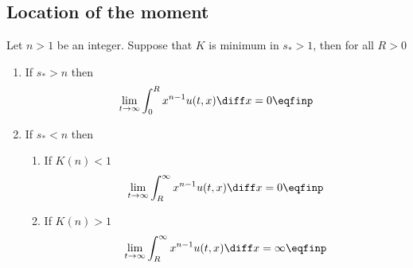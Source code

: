 \subsection{Location of the moment}

\begin{proposition} Let $n>1$ be an integer. Suppose that $K$ is minimum in $s_* > 1$, then for all $R > 0$
    \begin{enumerate}
        \item If $s_* > n$ then 
    \begin{align*}
        \lim_{t\to \infty} \int_0^R x^{n-1} u(t,x) \diff x = 0
        \eqfinp
    \end{align*}
        \item If $s_* < n$ then 
        \begin{enumerate}
            \item If $K(n) < 1$
            \begin{align*}
                \lim_{t\to \infty} \int_R^{\infty} x^{n-1} u(t,x) \diff x = 0
                \eqfinp
            \end{align*}
            \item If $K(n) > 1$
            \begin{align*}
                \lim_{t\to \infty} \int_R^{\infty} x^{n-1} u(t,x) \diff x = \infty
                \eqfinp
            \end{align*}
        \end{enumerate}
    \end{enumerate}
\end{proposition}

